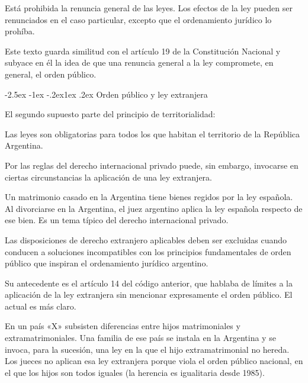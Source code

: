 \documentclass[12pt,oneside]{book}
\makeatletter
\renewcommand\subsection{\@startsection{subsection}{2}{\z@}%
  {-2.5ex \@plus -1ex \@minus -.2ex}{1ex \@plus .2ex}%
  {\normalfont\normalsize\bfseries}}
\makeatother
\begin{document}
\begin{regla}
Está prohibida la renuncia general de las leyes. Los efectos de la ley pueden ser renunciados en el caso particular, excepto que el ordenamiento jurídico lo prohíba.
\end{regla}

Este texto guarda similitud con el artículo 19 de la Constitución Nacional y subyace en él la idea de que una renuncia general a la ley compromete, en general, el orden público.

\subsection{Orden público y ley extranjera}

El segundo supuesto parte del principio de territorialidad:

\begin{regla}
Las leyes son obligatorias para todos los que habitan el territorio de la República Argentina.
\end{regla}

Por las reglas del derecho internacional privado puede, sin embargo, invocarse en ciertas circunstancias la aplicación de una ley extranjera.

\begin{ejemplo}
Un matrimonio casado en la Argentina tiene bienes regidos por la ley española. Al divorciarse en la Argentina, el juez argentino aplica la ley española respecto de ese bien. Es un tema típico del derecho internacional privado.
\end{ejemplo}

\begin{regla}
Las disposiciones de derecho extranjero aplicables deben ser excluidas cuando conducen a soluciones incompatibles con los principios fundamentales de orden público que inspiran el ordenamiento jurídico argentino.
\end{regla}

Su antecedente es el artículo 14 del código anterior, que hablaba de límites a la aplicación de la ley extranjera sin mencionar expresamente el orden público. El actual es más claro.

\begin{ejemplo}
En un país «X» subsisten diferencias entre hijos matrimoniales y extramatrimoniales. Una familia de ese país se instala en la Argentina y se invoca, para la sucesión, una ley en la que el hijo extramatrimonial no hereda. Los jueces no aplican esa ley extranjera porque viola el orden público nacional, en el que los hijos son todos iguales (la herencia es igualitaria desde 1985).
\end{ejemplo}
\end{document}
